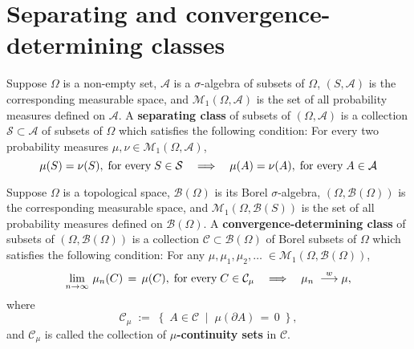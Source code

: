 

\section{Separating and convergence-determining classes}
\setcounter{theorem}{0}
\setcounter{equation}{0}

\renewcommand{\theenumi}{\roman{enumi}}
\renewcommand{\labelenumi}{\textnormal{(\theenumi)}$\;\;$}

\begin{definition}
\mbox{}\vskip 0.1cm
\noindent
Suppose $\Omega$ is a non-empty set, $\mathcal{A}$ is a $\sigma$-algebra of subsets of $\Omega$,
$(S,\mathcal{A})$ is the corresponding measurable space, and
$\mathcal{M}_{1}\!\left(\Omega,\mathcal{A}\right)$ is the set of all probability measures defined
on $\mathcal{A}$.
A \textbf{separating class} of subsets of $\left(\Omega,\mathcal{A}\right)$ is
a collection $\mathcal{S} \subset \mathcal{A}$ of subsets of $\Omega$
which satisfies the following condition:
For every two probability measures $\mu, \nu \in \mathcal{M}_{1}\!\left(\Omega,\mathcal{A}\right)$,
\begin{equation*}
\mu(S) = \nu(S), \;\textnormal{for every}\; S \in \mathcal{S}
\quad\Longrightarrow\quad
\mu(A) = \nu(A), \;\textnormal{for every}\; A \in \mathcal{A}		
\end{equation*}
\end{definition}

\begin{definition}
\mbox{}\vskip 0.1cm
\noindent
Suppose $\Omega$ is a topological space, $\mathcal{B}(\Omega)$ is its Borel $\sigma$-algebra,
$(\Omega,\mathcal{B}(\Omega))$ is the corresponding measurable space, and
$\mathcal{M}_{1}\!\left(\Omega,\mathcal{B}(S)\right)$ is the set of all probability measures defined
on $\mathcal{B}(\Omega)$.
A \textbf{convergence-determining class} of subsets of $\left(\Omega,\mathcal{B}(\Omega)\right)$ is
a collection $\mathcal{C} \subset \mathcal{B}(\Omega)$ of Borel subsets of $\Omega$
which satisfies the following condition:
For any $\mu, \mu_{1}, \mu_{2}, \ldots\; \in \mathcal{M}_{1}\!\left(\Omega,\mathcal{B}(\Omega)\right)$,
\begin{equation*}
\lim_{n\rightarrow\infty}\,\mu_{n}(C) \, = \, \mu(C), \;\textnormal{for every}\; C \in \mathcal{C}_{\mu}
\quad\Longrightarrow\quad
\mu_{n} \; \overset{w}{\longrightarrow} \mu,
\end{equation*}
where
\begin{equation*}
\mathcal{C}_{\mu} \; := \;
\left\{\;
A \in \mathcal{C}
\;\;\vert\;\;
\mu(\partial A) \,=\, 0
\;\right\},
\end{equation*}
and $\mathcal{C}_{\mu}$ is called the collection of \textbf{$\mu$-continuity sets} in $\mathcal{C}$.
\end{definition}

